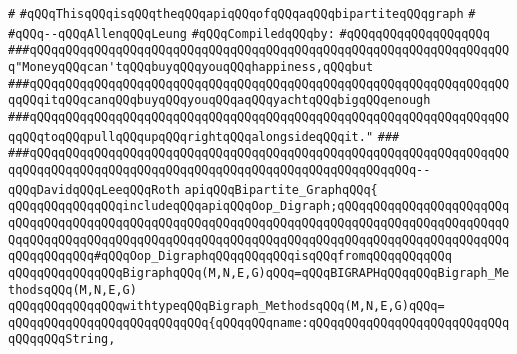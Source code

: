\label{src/lib/graph/bigraph.api}
\verb|#|\newline
\verb|#qQQqThisqQQqisqQQqtheqQQqapiqQQqofqQQqaqQQqbipartiteqQQqgraph|\newline
\verb|#|\newline
\verb|#qQQq--qQQqAllenqQQqLeung|\newline
\newline
\verb|#qQQqCompiledqQQqby:|\newline
\verb|#qQQqqQQqqQQqqQQqqQQq|\newline
\newline
\verb|###qQQqqQQqqQQqqQQqqQQqqQQqqQQqqQQqqQQqqQQqqQQqqQQqqQQqqQQqqQQqqQQqqQQq"MoneyqQQqcan'tqQQqbuyqQQqyouqQQqhappiness,qQQqbut|\newline
\verb|###qQQqqQQqqQQqqQQqqQQqqQQqqQQqqQQqqQQqqQQqqQQqqQQqqQQqqQQqqQQqqQQqqQQqqQQqitqQQqcanqQQqbuyqQQqyouqQQqaqQQqyachtqQQqbigqQQqenough|\newline
\verb|###qQQqqQQqqQQqqQQqqQQqqQQqqQQqqQQqqQQqqQQqqQQqqQQqqQQqqQQqqQQqqQQqqQQqqQQqtoqQQqpullqQQqupqQQqrightqQQqalongsideqQQqit."|\newline
\verb|###|\newline
\verb|###qQQqqQQqqQQqqQQqqQQqqQQqqQQqqQQqqQQqqQQqqQQqqQQqqQQqqQQqqQQqqQQqqQQqqQQqqQQqqQQqqQQqqQQqqQQqqQQqqQQqqQQqqQQqqQQqqQQqqQQqqQQq--qQQqDavidqQQqLeeqQQqRoth|\newline
\newline
\newline
\newline
\verb|apiqQQqBipartite_GraphqQQq{|\newline
\newline
\verb|qQQqqQQqqQQqqQQqincludeqQQqapiqQQqOop_Digraph;qQQqqQQqqQQqqQQqqQQqqQQqqQQqqQQqqQQqqQQqqQQqqQQqqQQqqQQqqQQqqQQqqQQqqQQqqQQqqQQqqQQqqQQqqQQqqQQqqQQqqQQqqQQqqQQqqQQqqQQqqQQqqQQqqQQqqQQqqQQqqQQqqQQqqQQqqQQqqQQqqQQqqQQqqQQqqQQq#qQQqOop_DigraphqQQqqQQqqQQqisqQQqfromqQQqqQQqqQQq|\newline
\newline
\verb|qQQqqQQqqQQqqQQqBigraphqQQq(M,N,E,G)qQQq=qQQqBIGRAPHqQQqqQQqBigraph_MethodsqQQq(M,N,E,G)|\newline
\verb|qQQqqQQqqQQqqQQqwithtypeqQQqBigraph_MethodsqQQq(M,N,E,G)qQQq=|\newline
\verb|qQQqqQQqqQQqqQQqqQQqqQQqqQQq{qQQqqQQqname:qQQqqQQqqQQqqQQqqQQqqQQqqQQqqQQqqQQqString,|\newline
